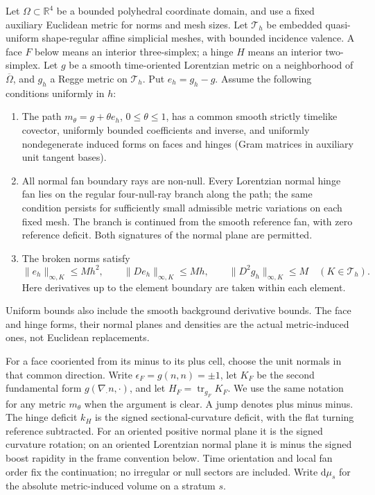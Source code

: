 \documentclass[11pt]{article}
\newcommand{\dd}{\mathrm d}
\newcommand{\tr}{\operatorname{tr}}
\newcommand{\cT}{\mathcal T}
\begin{document}
Let \(\Omega\subset\mathbb R^4\) be a bounded polyhedral coordinate domain, and use a fixed auxiliary Euclidean metric for norms and mesh sizes. Let \(\cT_h\) be embedded quasi-uniform shape-regular affine simplicial meshes, with bounded incidence valence. A face \(F\) below means an interior three-simplex; a hinge \(H\) means an interior two-simplex. Let \(g\) be a smooth time-oriented Lorentzian metric on a neighborhood of \(\overline\Omega\), and \(g_h\) a Regge metric on \(\cT_h\). Put \(e_h=g_h-g\). Assume the following conditions uniformly in \(h\):
\begin{enumerate}
\item The path \(m_\theta=g+\theta e_h\), \(0\leq\theta\leq1\), has a common smooth strictly timelike covector, uniformly bounded coefficients and inverse, and uniformly nondegenerate induced forms on faces and hinges (Gram matrices in auxiliary unit tangent bases).
\item All normal fan boundary rays are non-null. Every Lorentzian normal hinge fan lies on the regular four-null-ray branch along the path; the same condition persists for sufficiently small admissible metric variations on each fixed mesh. The branch is continued from the smooth reference fan, with zero reference deficit. Both signatures of the normal plane are permitted.
\item The broken norms satisfy
\[
 \|e_h\|_{\infty,K}\leq Mh^2,\qquad
 \|D e_h\|_{\infty,K}\leq Mh,\qquad
 \|D^2g_h\|_{\infty,K}\leq M\quad (K\in\cT_h).
\]
Here derivatives up to the element boundary are taken within each element.
\end{enumerate}
Uniform bounds also include the smooth background derivative bounds. The face and hinge forms, their normal planes and densities are the actual metric-induced ones, not Euclidean replacements.

For a face cooriented from its minus to its plus cell, choose the unit normals in that common direction. Write \(\epsilon_F=g(n,n)=\pm1\), let \(K_F\) be the second fundamental form \(g(\nabla_{\cdot} n,\cdot)\), and let \(H_F=\tr_{g_F}K_F\). We use the same notation for any metric \(m_\theta\) when the argument is clear. A jump denotes plus minus minus. The hinge deficit \(k_H\) is the signed sectional-curvature deficit, with the flat turning reference subtracted. For an oriented positive normal plane it is the signed curvature rotation; on an oriented Lorentzian normal plane it is minus the signed boost rapidity in the frame convention below. Time orientation and local fan order fix the continuation; no irregular or null sectors are included. Write \(\dd\mu_s\) for the absolute metric-induced volume on a stratum \(s\).
\end{document}
